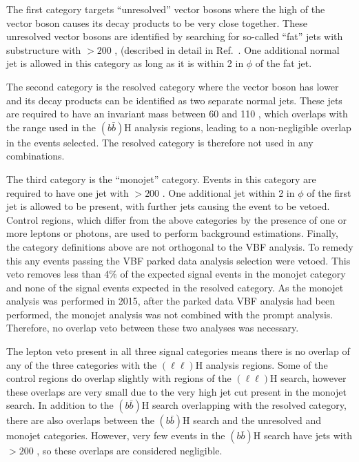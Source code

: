 The first category targets ``unresolved'' vector bosons where the high \pt of the vector boson causes its decay products to be very close together. These unresolved vector bosons are identified by searching for so-called ``fat'' jets with substructure with \pt$>200$ \GeV, (described in detail in Ref.~\cite{CMS-PAS-EXO-12-055}. One additional normal jet is allowed in this category as long as it is within 2 in $\phi$ of the fat jet.

The second category is the resolved category where the vector boson has lower \pt and its decay products can be identified as two separate normal jets. These jets are required to have an invariant mass between 60 and 110 \GeV, which overlaps with the range used in the \PZ$(b\bar{b})$H analysis regions, leading to a non-negligible overlap in the events selected. The resolved category is therefore not used in any combinations.

The third category is the ``monojet'' category. Events in this category are required to have one jet with \pt$>200$ \GeV. One additional jet within 2 in $\phi$ of the first jet is allowed to be present, with further jets causing the event to be vetoed. Control regions, which differ from the above categories by the presence of one or more leptons or photons, are used to perform background estimations. Finally, the category definitions above are not orthogonal to the \ac{VBF} analysis. To remedy this any events passing the \ac{VBF} parked data analysis selection were vetoed. This veto removes less than 4\% of the expected signal events in the monojet category and none of the signal events expected in the resolved category. As the monojet analysis was performed in 2015, after the parked data \ac{VBF} analysis had been performed, the monojet analysis was not combined with the prompt analysis. Therefore, no overlap veto between these two analyses was necessary.

The lepton veto present in all three signal categories means there is no overlap of any of the three categories with the \PZ$(\ell\ell)$H analysis regions. Some of the control regions do overlap slightly with regions of the \PZ$(\ell\ell)$H search, however these overlaps are very small due to the very high jet \pt cut present in the monojet search. In addition to the \PZ$(b\bar{b})$H search overlapping with the resolved category, there are also overlaps between the \PZ$(b\bar{b})$H search and the  unresolved and monojet categories. However, very few events in the \PZ$(b\bar{b})$H search have jets with \pt$>200$ \GeV, so these overlaps are considered negligible.

